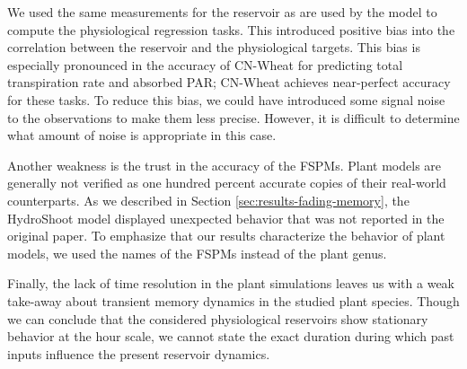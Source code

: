 \documentclass[10pt,a4paper,journal]{IEEEtran}
\begin{document}
We used the same measurements for the reservoir as are used by the model to compute the physiological regression tasks.
This introduced positive bias into the correlation between the reservoir and the physiological targets.
This bias is especially pronounced in the accuracy of CN-Wheat for predicting total transpiration rate and absorbed PAR; 
CN-Wheat achieves near-perfect accuracy for these tasks.
To reduce this bias, we could have introduced some signal noise to the observations to make them less precise.
However, it is difficult to determine what amount of noise is appropriate in this case.


Another weakness is the trust in the accuracy of the FSPMs.
Plant models are generally not verified as one hundred percent accurate copies of their real-world counterparts.
As we described in Section \ref{sec:results-fading-memory}, the HydroShoot model displayed unexpected behavior that was not reported in the original paper.
To emphasize that our results characterize the behavior of plant models, we used the names of the FSPMs instead of the plant genus. 

Finally, the lack of time resolution in the plant simulations leaves us with a weak take-away about transient memory dynamics in the studied plant species.
Though we can conclude that the considered physiological reservoirs show stationary behavior at the hour scale, we cannot state the exact duration during which past inputs influence the present reservoir dynamics.
\end{document}
